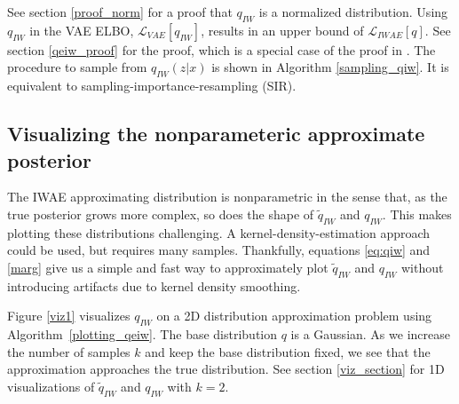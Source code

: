 \documentclass{article} %
\begin{document}
See section \ref{proof_norm} for a proof that $q_{IW}$ is a normalized distribution. Using $q_{IW}$ in the VAE ELBO, $\mathcal{L}_{VAE}[q_{IW}]$, results in an upper bound of $\mathcal{L}_{IWAE}[q]$. See section \ref{qeiw_proof} for the proof, which is a special case of the proof in \cite{vsmc}. The procedure to sample from $q_{IW}(z|x)$ is shown in Algorithm \ref{sampling_qiw}. It is equivalent to sampling-importance-resampling (SIR). 


\subsection{Visualizing the nonparameteric approximate posterior}
The IWAE approximating distribution is nonparametric in the sense that, as the true posterior grows more complex, so does the shape of $\tilde{q}_{IW}$ and $q_{IW}$.
This makes plotting these distributions challenging.
A kernel-density-estimation approach could be used, but requires many samples.
Thankfully, equations \eqref{eq:qiw} and \eqref{marg} give us a simple and fast way to approximately plot $\tilde{q}_{IW}$ and $q_{IW}$ without introducing artifacts due to kernel density smoothing.

Figure \ref{viz1} visualizes $q_{IW}$ on a 2D distribution approximation problem using Algorithm~\ref{plotting_qeiw}.
The base distribution $q$ is a Gaussian.
As we increase the number of samples $k$ and keep the base distribution fixed, we see that the approximation approaches the true distribution. See section \ref{viz_section} for 1D visualizations of $\tilde{q}_{IW}$ and ${q}_{IW}$ with $k=2$.
\end{document}
